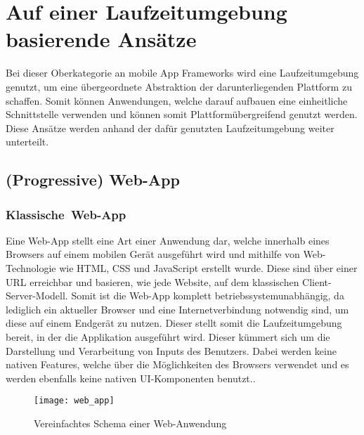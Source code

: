 \section{Auf einer Laufzeitumgebung basierende Ansätze}
Bei dieser Oberkategorie an mobile App Frameworks wird eine Laufzeitumgebung genutzt, um eine übergeordnete Abstraktion der darunterliegenden Plattform zu schaffen. Somit können Anwendungen, welche darauf aufbauen eine einheitliche Schnittstelle verwenden und können somit Plattformübergreifend genutzt werden.
Diese Ansätze werden anhand der dafür genutzten Laufzeitumgebung weiter unterteilt.


\subsection{(Progressive) Web-App}

\subsubsection{\glqq Klassische\grqq\  Web-App}

Eine Web-App stellt eine Art einer Anwendung dar, welche innerhalb eines Browsers auf einem mobilen Gerät ausgeführt wird und mithilfe von Web-Technologie wie \ac{HTML}, \ac{CSS} und JavaScript erstellt wurde. Diese sind über einer \ac{URL} erreichbar und basieren, wie jede Website, auf dem klassischen Client-Server-Modell. Somit ist die Web-App komplett betriebssystemunabhängig, da lediglich ein aktueller Browser und eine Internetverbindung notwendig sind, um diese auf einem Endgerät zu nutzen. Dieser stellt somit die Laufzeitumgebung bereit, in der die Applikation ausgeführt wird. Dieser kümmert sich um die Darstellung und Verarbeitung von Inputs des Benutzers. Dabei werden keine nativen Features, welche über die Möglichkeiten des Browsers verwendet und es werden ebenfalls keine nativen \ac{UI}-Komponenten benutzt.\cite{waffa_tax_dev_approaches}.

\begin{figure}[h]
	\texttt{[image: web\_app]}
	\centering
	\caption{Vereinfachtes Schema einer Web-Anwendung}
\end{figure}


